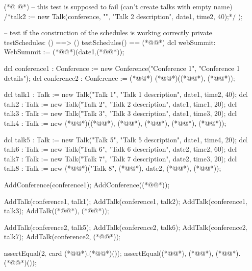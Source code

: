 \begin{vdmpp}[breaklines=true]
(*@
\label{testSchedules:179}
@*)
  -- this test is supposed to fail (can't create talks with empty name)
  /*talk2 := new Talk(conference, "", "Talk 2 description", date1, time2, 40);*/
 );
 
 
 -- test if the construction of the schedules is working correctly
 private testSchedules: () ==> ()
 testSchedules() == (*@\vdmnotcovered{(}@*)
  dcl webSummit: WebSummit := (*@@*)(date1,(*@@*));
  
  dcl conference1 : Conference := new Conference("Conference 1", "Conference 1 details");
  dcl conference2 : Conference := (*@@*) (*@@*)((*@@*), (*@@*));
  
  dcl talk1 : Talk := new Talk("Talk 1", "Talk 1 description", date1, time2, 40);
  dcl talk2 : Talk := new Talk("Talk 2", "Talk 2 description", date1, time1, 20); 
  dcl talk3 : Talk := new Talk("Talk 3", "Talk 3 description", date1, time3, 20);
  dcl talk4 : Talk := new (*@@*)((*@@*), (*@@*), (*@@*), (*@@*), (*@@*));
 
  dcl talk5 : Talk := new Talk("Talk 5", "Talk 5 description", date1, time4, 20);
  dcl talk6 : Talk := new Talk("Talk 6", "Talk 6 description", date2, time2, 60);
  dcl talk7 : Talk := new Talk("Talk 7", "Talk 7 description", date2, time3, 20);
  dcl talk8 : Talk := new (*@@*)("Talk 8", (*@@*), date2, (*@@*), (*@@*));
  
  AddConference(conference1);
  AddConference((*@@*));
  
  AddTalk(conference1, talk1);
  AddTalk(conference1, talk2);
  AddTalk(conference1, talk3);
  AddTalk((*@@*), (*@@*));
  
  AddTalk(conference2, talk5);
  AddTalk(conference2, talk6);
  AddTalk(conference2, talk7);
  AddTalk(conference2, (*@@*));
  
  assertEqual(2, card (*@@*).(*@@*)());
  assertEqual({(*@@*), (*@@*)}, (*@@*).(*@@*)());
  

\end{vdmpp}
